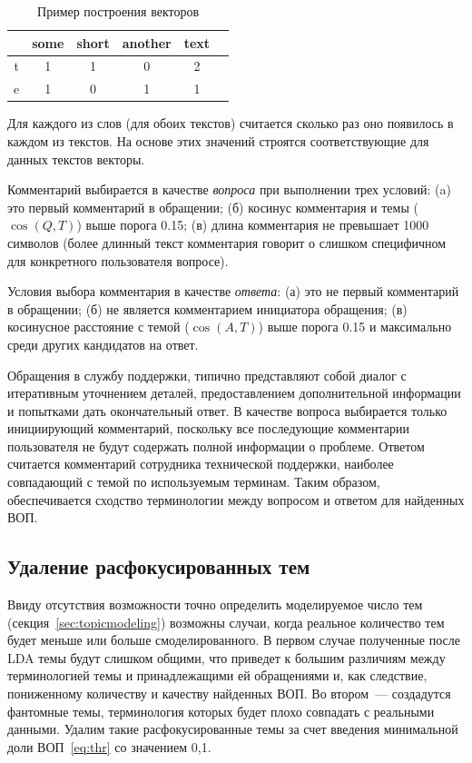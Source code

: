\begin{table}[!ht]
\caption{Пример построения векторов}
\label{text_vect}
\centering
\begin{tabular}{|c|c|c|c|c|c|}
\hline
 & some & short & another & text \\
\hline
t & 1 & 1 & 0 & 2\\
\hline
e & 1 & 0 & 1 & 1\\
\hline
\end{tabular}
\end{table}

Для каждого из слов (для обоих текстов) считается сколько раз оно появилось в каждом из текстов. На основе этих значений строятся соответствующие для данных текстов векторы.

Комментарий выбирается в качестве \textit{вопроса} при выполнении трех условий: (a) это первый комментарий в обращении; (б) косинус комментария и темы ($\cos(Q,T)$) выше порога 0.15; (в) длина комментария не превышает 1000 символов (более длинный текст комментария говорит о слишком специфичном для конкретного пользователя вопросе).

Условия выбора комментария в качестве \textit{ответа}: (а) это не первый комментарий в обращении; (б) не является комментарием инициатора обращения; (в) косинусное расстояние с темой ($\cos(A,T)$) выше порога 0.15 и максимально среди других кандидатов на ответ.

Обращения в службу поддержки, типично представляют собой диалог с итеративным уточнением деталей, предоставлением дополнительной информации и попытками дать окончательный ответ. В качестве вопроса выбирается только инициирующий комментарий, поскольку все последующие комментарии пользователя не будут содержать полной информации о проблеме. Ответом считается комментарий сотрудника технической поддержки, наиболее совпадающий с темой по используемым терминам. Таким образом, обеспечивается сходство терминологии между вопросом и ответом для найденных ВОП.

\subsection{Удаление расфокусированных тем}
\label{subsec:deleteunfocusedtopics}

Ввиду отсутствия возможности точно определить моделируемое число тем (секция~\ref{sec:topicmodeling}) возможны случаи, когда реальное количество тем будет меньше или больше смоделированного. В первом случае полученные после LDA темы будут слишком общими, что приведет к большим различиям между терминологией темы и принадлежащими ей обращениями и, как следствие, пониженному количеству и качеству найденных ВОП. Во втором~--- создадутся фантомные темы, терминология которых будет плохо совпадать с реальными данными. Удалим такие расфокусированные темы за счет введения минимальной доли ВОП~\eqref{eq:thr} со значением 0,1.

